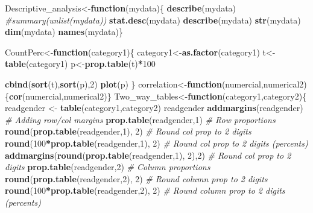 \documentclass[]{article}
\newenvironment{Shaded}{\begin{snugshade}}{\end{snugshade}}
\newcommand{\CommentTok}[1]{\textcolor[rgb]{0.56,0.35,0.01}{\textit{#1}}}
\newcommand{\ControlFlowTok}[1]{\textcolor[rgb]{0.13,0.29,0.53}{\textbf{#1}}}
\newcommand{\DecValTok}[1]{\textcolor[rgb]{0.00,0.00,0.81}{#1}}
\newcommand{\KeywordTok}[1]{\textcolor[rgb]{0.13,0.29,0.53}{\textbf{#1}}}
\newcommand{\NormalTok}[1]{#1}
\newcommand{\OperatorTok}[1]{\textcolor[rgb]{0.81,0.36,0.00}{\textbf{#1}}}
\newcommand{\StringTok}[1]{\textcolor[rgb]{0.31,0.60,0.02}{#1}}
\begin{document}
\begin{Shaded}
\begin{Highlighting}[]
\NormalTok{Descriptive_analysis<-}\ControlFlowTok{function}\NormalTok{(mydata)\{}
\KeywordTok{describe}\NormalTok{(mydata)}
\CommentTok{#summary(unlist(mydata))}
\KeywordTok{stat.desc}\NormalTok{(mydata)}
\KeywordTok{describe}\NormalTok{(mydata) }
\KeywordTok{str}\NormalTok{(mydata)}
\KeywordTok{dim}\NormalTok{(mydata)}
\KeywordTok{names}\NormalTok{(mydata)\}}

\NormalTok{CountPerc<-}\ControlFlowTok{function}\NormalTok{(category1)\{}
\NormalTok{category1<-}\KeywordTok{as.factor}\NormalTok{(category1)}
\NormalTok{t<-}\KeywordTok{table}\NormalTok{(category1)}
\NormalTok{p<-}\KeywordTok{prop.table}\NormalTok{(t)}\OperatorTok{*}\DecValTok{100}

\KeywordTok{cbind}\NormalTok{(}\KeywordTok{sort}\NormalTok{(t),}\KeywordTok{sort}\NormalTok{(p),}\DecValTok{2}\NormalTok{)}
\KeywordTok{plot}\NormalTok{(p)}
\NormalTok{\}}
\NormalTok{correlation<-}\ControlFlowTok{function}\NormalTok{(numercial,numerical2)\{}\KeywordTok{cor}\NormalTok{(numercial,numerical2)\}}
\NormalTok{Two_way_tables<-}\ControlFlowTok{function}\NormalTok{(category1,category2)\{}
\NormalTok{readgender <-}\StringTok{ }\KeywordTok{table}\NormalTok{(category1,category2)}
\NormalTok{readgender}
\KeywordTok{addmargins}\NormalTok{(readgender) }\CommentTok{# Adding row/col margins}
\KeywordTok{prop.table}\NormalTok{(readgender,}\DecValTok{1}\NormalTok{) }\CommentTok{# Row proportions}
\KeywordTok{round}\NormalTok{(}\KeywordTok{prop.table}\NormalTok{(readgender,}\DecValTok{1}\NormalTok{), }\DecValTok{2}\NormalTok{) }\CommentTok{# Round col prop to 2 digits}
\KeywordTok{round}\NormalTok{(}\DecValTok{100}\OperatorTok{*}\KeywordTok{prop.table}\NormalTok{(readgender,}\DecValTok{1}\NormalTok{), }\DecValTok{2}\NormalTok{) }\CommentTok{# Round col prop to 2 digits (percents)}
\KeywordTok{addmargins}\NormalTok{(}\KeywordTok{round}\NormalTok{(}\KeywordTok{prop.table}\NormalTok{(readgender,}\DecValTok{1}\NormalTok{), }\DecValTok{2}\NormalTok{),}\DecValTok{2}\NormalTok{) }\CommentTok{# Round col prop to 2 digits}
\KeywordTok{prop.table}\NormalTok{(readgender,}\DecValTok{2}\NormalTok{) }\CommentTok{# Column proportions}
\KeywordTok{round}\NormalTok{(}\KeywordTok{prop.table}\NormalTok{(readgender,}\DecValTok{2}\NormalTok{), }\DecValTok{2}\NormalTok{) }\CommentTok{# Round column prop to 2 digits}
\KeywordTok{round}\NormalTok{(}\DecValTok{100}\OperatorTok{*}\KeywordTok{prop.table}\NormalTok{(readgender,}\DecValTok{2}\NormalTok{), }\DecValTok{2}\NormalTok{) }\CommentTok{# Round column prop to 2 digits (percents)}

\end{Highlighting}
\end{Shaded}
\end{document}
